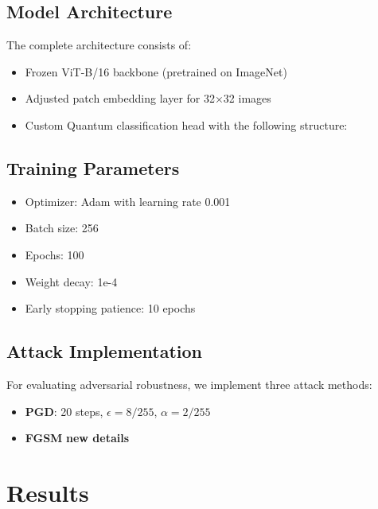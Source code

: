 \documentclass[11pt, conference]{IEEEtran}
\begin{document}
\subsection{Model Architecture} %
The complete architecture consists of:
\begin{itemize}
    \item Frozen ViT-B/16 backbone (pretrained on ImageNet)
    \item Adjusted patch embedding layer for 32×32 images
    \item Custom Quantum classification head with the following structure:
\end{itemize}

\subsection{Training Parameters}
\begin{itemize}
    \item Optimizer: Adam with learning rate 0.001
    \item Batch size: 256
    \item Epochs: 100
    \item Weight decay: 1e-4
    \item Early stopping patience: 10 epochs
\end{itemize}

\subsection{Attack Implementation}
For evaluating adversarial robustness, we implement three attack methods:
\begin{itemize}
    \item \textbf{PGD}: 20 steps, $\epsilon = 8/255$, $\alpha = 2/255$
    \item \textbf{FGSM} \textbf{new details}
\end{itemize}

\section{Results}
\end{document}
